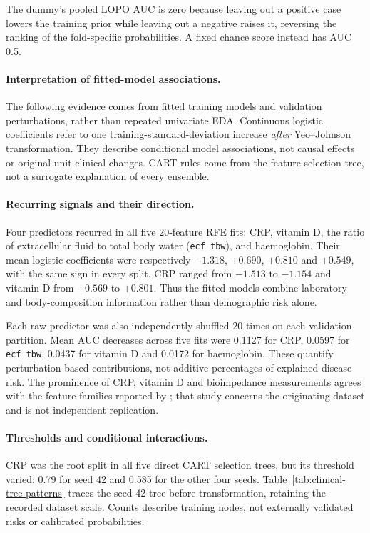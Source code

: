 The dummy's pooled LOPO AUC is zero because leaving
out a positive case lowers the training prior while leaving out a negative
raises it, reversing the ranking of the fold-specific probabilities. A fixed
chance score instead has AUC 0.5.

\paragraph{Interpretation of fitted-model associations.}
\label{subsec:model-clinical-patterns}

The following evidence comes from fitted training models and validation perturbations, rather than repeated univariate EDA. Continuous logistic coefficients refer to one training-standard-deviation increase \emph{after} Yeo--Johnson transformation. They describe conditional model associations, not causal effects or original-unit clinical changes. CART rules come from the feature-selection tree, not a surrogate explanation of every ensemble.

\paragraph{Recurring signals and their direction.}
Four predictors recurred in all five 20-feature RFE fits: CRP, vitamin D, the ratio of extracellular fluid to total body water (\texttt{ecf\_tbw}), and haemoglobin. Their mean logistic coefficients were respectively $-1.318$, $+0.690$, $+0.810$ and $+0.549$, with the same sign in every split. CRP ranged from $-1.513$ to $-1.154$ and vitamin D from $+0.569$ to $+0.801$. Thus the fitted models combine laboratory and body-composition information rather than demographic risk alone.

Each raw predictor was also independently shuffled 20 times on each validation partition. Mean AUC decreases across five fits were 0.1127 for CRP, 0.0597 for \texttt{ecf\_tbw}, 0.0437 for vitamin D and 0.0172 for haemoglobin. These quantify perturbation-based contributions, not additive percentages of explained disease risk. The prominence of CRP, vitamin D and bioimpedance measurements agrees with the feature families reported by \textcite{esen2024early}; that study concerns the originating dataset and is not independent replication.

\paragraph{Thresholds and conditional interactions.}
CRP was the root split in all five direct CART selection trees, but its threshold varied: 0.79 for seed 42 and 0.585 for the other four seeds. Table~\ref{tab:clinical-tree-patterns} traces the seed-42 tree before transformation, retaining the recorded dataset scale. Counts describe training nodes, not externally validated risks or calibrated probabilities.



